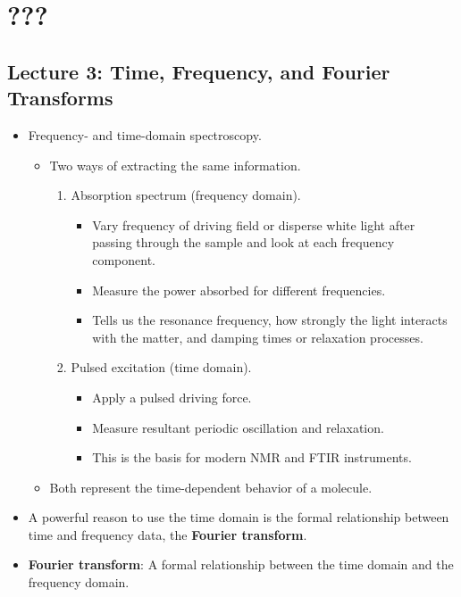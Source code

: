 \documentclass[../notes.tex]{subfiles}
\begin{document}
\chapter{???}
\section{Lecture 3: Time, Frequency, and Fourier Transforms}
\begin{itemize}
    \item {}Frequency- and time-domain spectroscopy.
    \begin{itemize}
        \item Two ways of extracting the same information.
        \begin{enumerate}
            \item Absorption spectrum (frequency domain).
            \begin{itemize}
                \item Vary frequency of driving field or disperse white light after passing through the sample and look at each frequency component.
                \item Measure the power absorbed for different frequencies.
                \item Tells us the resonance frequency, how strongly the light interacts with the matter, and damping times or relaxation processes.
            \end{itemize}
            \item Pulsed excitation (time domain).
            \begin{itemize}
                \item Apply a pulsed driving force.
                \item Measure resultant periodic oscillation and relaxation.
                \item This is the basis for modern NMR and FTIR instruments.
            \end{itemize}
        \end{enumerate}
        \item Both represent the time-dependent behavior of a molecule.
    \end{itemize}
    \item A powerful reason to use the time domain is the formal relationship between time and frequency data, the \textbf{Fourier transform}.
    \item \textbf{Fourier transform}: A formal relationship between the time domain and the frequency domain.

\end{itemize}
\end{document}
